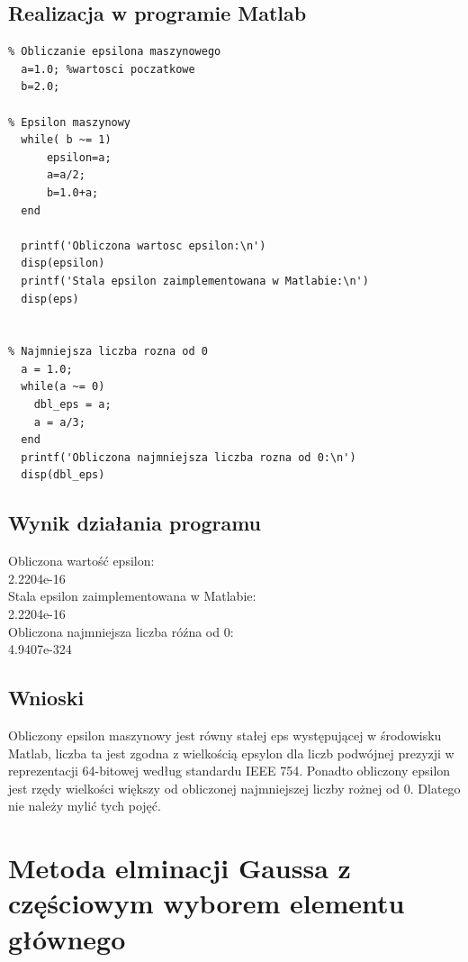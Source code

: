 \documentclass[a4paper, 11pt]{article}
\begin{document}
\subsection{Realizacja w programie Matlab}

\begin{lstlisting}
% Obliczanie epsilona maszynowego 
  a=1.0; %wartosci poczatkowe
  b=2.0; 
 
% Epsilon maszynowy 
  while( b ~= 1)
      epsilon=a; 
      a=a/2; 
      b=1.0+a; 
  end
  
  printf('Obliczona wartosc epsilon:\n')
  disp(epsilon)
  printf('Stala epsilon zaimplementowana w Matlabie:\n')
  disp(eps)
  
  
% Najmniejsza liczba rozna od 0
  a = 1.0;
  while(a ~= 0)
    dbl_eps = a; 
    a = a/3; 
  end
  printf('Obliczona najmniejsza liczba rozna od 0:\n')
  disp(dbl_eps)

\end{lstlisting}

\vspace{1cm}

\subsection{Wynik działania programu}

Obliczona wartość epsilon:\\
	2.2204e-16\\
Stala epsilon zaimplementowana w Matlabie:\\
	2.2204e-16\\
Obliczona najmniejsza liczba róźna od 0:\\
	4.9407e-324\\
	
\subsection{Wnioski}
\indent 

Obliczony epsilon maszynowy jest równy stałej eps występującej w środowisku Matlab, liczba ta jest zgodna z wielkością epsylon dla liczb podwójnej prezyzji w reprezentacji 64-bitowej według standardu IEEE 754. 
Ponadto obliczony epsilon jest rzędy wielkości większy od obliczonej najmniejszej liczby rożnej od 0. Dlatego nie należy mylić tych pojęć.~\cite{second}


\section{Metoda elminacji Gaussa z częściowym wyborem elementu głównego}
\end{document}
